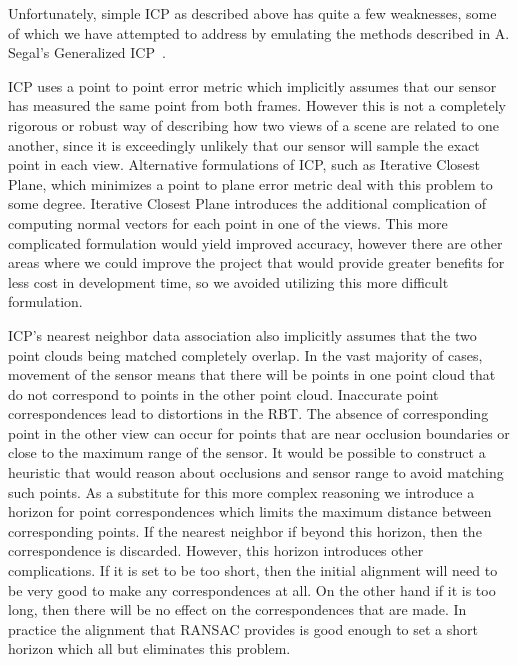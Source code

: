 \documentclass[letterpaper, 10pt, conference]{ieeeconf}
\begin{document}
	Unfortunately, simple ICP as described above has quite a few weaknesses, some of which we have attempted to address
by emulating the methods described in A. Segal's Generalized ICP~\cite{gicp}.

	ICP uses a point to point error metric which implicitly assumes that our sensor has measured the same point from both frames.  However this is not a completely rigorous or robust way of describing how two views of a scene are related to one another, since it is exceedingly unlikely that our sensor will sample the exact point in each view.  Alternative formulations of ICP, such as Iterative Closest Plane, which minimizes a point to plane error metric deal with this problem to some degree.  Iterative Closest Plane introduces the additional complication of computing normal vectors for each point in one of the views.  This more complicated formulation would yield improved accuracy, however there are other areas where we could improve the project that would provide greater benefits for less cost in development time, so we avoided utilizing this more difficult formulation.

	ICP's nearest neighbor data association also implicitly assumes that the two point clouds being matched completely overlap.  In the vast majority of cases, movement of the sensor means that there will be points in one point cloud that do not correspond to points in the other point cloud.  Inaccurate point correspondences lead to distortions in the RBT.  The absence of corresponding point in the other view can occur for points that are near occlusion boundaries or close to the maximum range of the sensor.  It would be possible to construct a heuristic that would reason about occlusions and sensor range to avoid matching such points.  As a substitute for this more complex reasoning we introduce a horizon for point correspondences which limits the maximum distance between corresponding points.   If the nearest neighbor if beyond this horizon, then the correspondence is discarded.  However, this horizon introduces other complications.  If it is set to be too short, then the initial alignment will need to be very good to make any correspondences at all.  On the other hand if it is too long, then there will be no effect on the correspondences that are made.  In practice the alignment that RANSAC provides is good enough  to set a short horizon which all but eliminates this problem.
\end{document}
